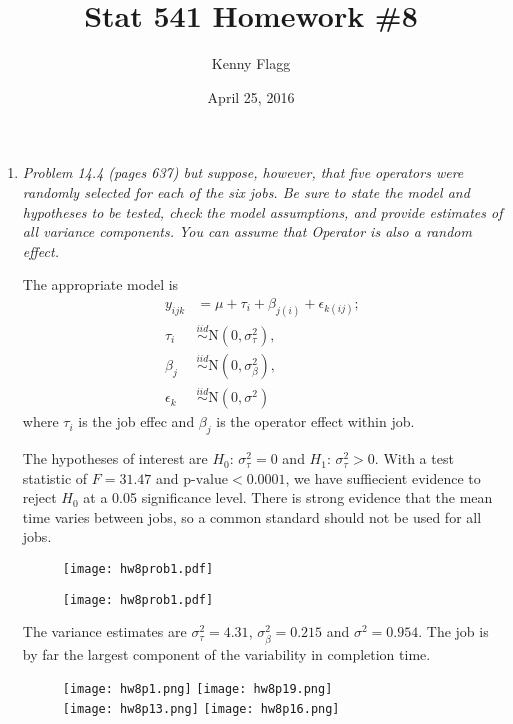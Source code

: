 \documentclass[11pt]{article}
\title{Stat 541 Homework \#8}
\author{Kenny Flagg}
\date{April 25, 2016}
\begin{document}
\thispagestyle{plain}
\maketitle

\begin{enumerate}

\item %
{\it Problem 14.4 (pages 637) but suppose, however, that five operators were
randomly selected for each of the six jobs. Be sure to state the model and
hypotheses to be tested, check the model assumptions, and provide estimates of
all variance components. You can assume that Operator is also a random effect.}

The appropriate model is
\begin{align*}
y_{ijk}&=\mu+\tau_{i}+\beta_{j(i)}+\epsilon_{k(ij)};\\
\tau_{i}&\overset{iid}{\sim}\mathrm{N}(0,\sigma^2_\tau),\\
\beta_{j}&\overset{iid}{\sim}\mathrm{N}(0,\sigma^2_\beta),\\
\epsilon_{k}&\overset{iid}{\sim}\mathrm{N}(0,\sigma^2)
\end{align*}
where \(\tau_{i}\) is the job effec and \(\beta_{j}\) is the operator effect
within job.

The hypotheses of interest are \(H_0\text{: }\sigma^2_\tau=0\) and
\(H_1\text{: }\sigma^2_\tau>0\). With a test statistic of \(F=31.47\) and
\(\text{p-value}<0.0001\), we have suffiecient evidence to reject \(H_0\) at
a 0.05 significance level. There is strong evidence that the mean time varies
between jobs, so a common standard should not be used for all jobs.

\begin{figure}[H]\centering
\texttt{[image: hw8prob1.pdf]}
\end{figure}

\begin{figure}[H]\centering
\texttt{[image: hw8prob1.pdf]}
\end{figure}

The variance estimates are \(\sigma^2_\tau=4.31\), \(\sigma^2_\beta=0.215\)
and \(\sigma^2=0.954\). The job is by far the largest component of the
variability in completion time.

\begin{figure}[H]\centering
\texttt{[image: hw8p1.png]}
\texttt{[image: hw8p19.png]}\\
\texttt{[image: hw8p13.png]}
\texttt{[image: hw8p16.png]}
\end{figure}


\end{enumerate}
\end{document}
